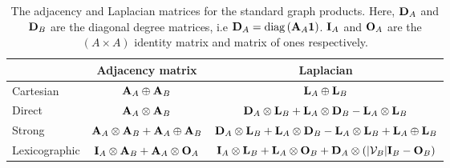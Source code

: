 \begin{table}[b]
    \def\arraystretch{1.8}
    \centering
    \small
    \vspace{0.5cm}
    \begin{tabular}{|l|cc|}
        \hline

         & Adjacency matrix
         & Laplacian                                                                              \\

        \hline

        Cartesian
         & $\mathbf{A}_A \oplus \mathbf{A}_B$
         & $\mathbf{L}_A \oplus \mathbf{L}_B$                                                                   \\

        Direct
         & $\mathbf{A}_A \otimes \mathbf{A}_B$
         & $\mathbf{D}_A \otimes \mathbf{L}_B + \mathbf{L}_A \otimes \mathbf{D}_B - \mathbf{L}_A \otimes \mathbf{L}_B$                        \\

        Strong
         & $\mathbf{A}_A \otimes \mathbf{A}_B + \mathbf{A}_A \oplus \mathbf{A}_B$
         & $\mathbf{D}_A \otimes \mathbf{L}_B + \mathbf{L}_A \otimes \mathbf{D}_B - \mathbf{L}_A \otimes \mathbf{L}_B + \mathbf{L}_A \oplus \mathbf{L}_B$   \\

        Lexicographic
         & $\mathbf{I}_A \otimes \mathbf{A}_B + \mathbf{A}_A \otimes \mathbf{O}_A$
         & $\mathbf{I}_A \otimes \mathbf{L}_B + \mathbf{L}_A \otimes \mathbf{O}_B + \mathbf{D}_A \otimes (|\mathcal{V}_B| \mathbf{I}_B - \mathbf{O}_B)$ \\

        \hline
    \end{tabular}
    \vspace{0.2cm}
    \caption[The adjacency and Laplacian matrices for the standard graph products]{The adjacency and Laplacian matrices for the standard graph products. Here, $\mathbf{D}_A$ and $\mathbf{D}_B$ are the diagonal degree matrices, i.e $\mathbf{D}_A = \text{\textup{diag}}\left(\mathbf{A}_A \mathbf{1}\right)$. $\mathbf{I}_A$ and $\mathbf{O}_A$ are the $(A \times A)$ identity matrix and matrix of ones respectively. }
    \vspace{0.3cm}
    \label{tab:grap_product_matrices}
\end{table}

